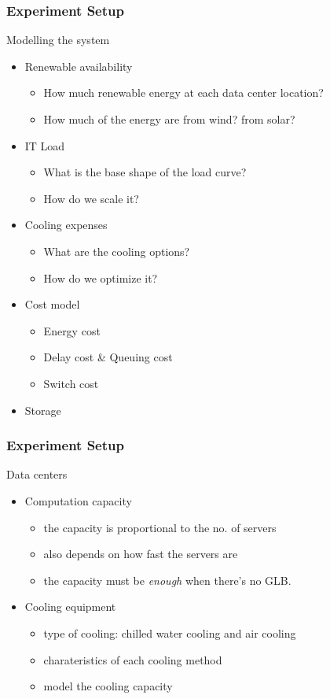 \documentclass{beamer}
\begin{document}
%
%
\begin{frame}
\frametitle{Experiment Setup}
\begin{block}
{Modelling the system}
\begin{itemize}
\item
Renewable availability
	\begin{itemize}
	\item
	How much renewable energy at each data center location?
	\item
	How much of the energy are from wind? from solar?
        \end{itemize}
\item
IT Load
	\begin{itemize}
	\item
	What is the base shape of the load curve?
	\item
	How do we scale it?	
	\end{itemize}
\item
Cooling expenses
	\begin{itemize}
	\item
	What are the cooling options?
	\item
	How do we optimize it?
	\end{itemize}
\item
Cost model
	\begin{itemize}
	\item
	Energy cost
	\item
	Delay cost \& Queuing cost
	\item
	Switch cost
	\end{itemize}

\item
Storage
\end{itemize}
\end{block}
\end{frame}
%
%
\begin{frame}
\frametitle{Experiment Setup}
\begin{block}
{Data centers}
\begin{itemize}
\item
Computation capacity
	\begin{itemize}
	\item
	the capacity is proportional to the no. of servers
	\item
	also depends on how fast the servers are
	\item
	the capacity must be \emph{enough} when there's no GLB.
	\end{itemize}
\item
Cooling equipment
	\begin{itemize}
	\item
	type of cooling: chilled water cooling and air cooling
	\item
	charateristics of each cooling method
	\item
	model the cooling capacity
	\end{itemize}
\end{itemize}
\end{block}
\end{frame}
\end{document}
